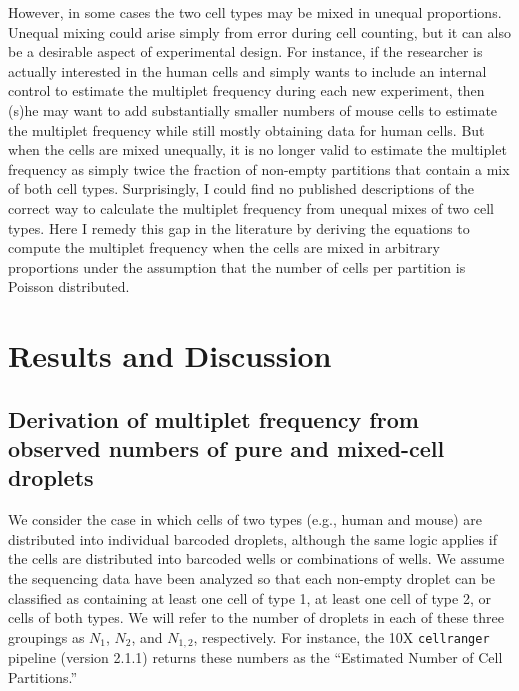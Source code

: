 \documentclass[fleqn,10pt,lineno]{wlpeerj} %
\begin{document}
However, in some cases the two cell types may be mixed in unequal proportions.
Unequal mixing could arise simply from error during cell counting, but it can also be a desirable aspect of experimental design.
For instance, if the researcher is actually interested in the human cells and simply wants to include an internal control to estimate the multiplet frequency during each new experiment, then (s)he may want to add substantially smaller numbers of mouse cells to estimate the multiplet frequency while still mostly obtaining data for human cells.
But when the cells are mixed unequally, it is no longer valid to estimate the multiplet frequency as simply twice the fraction of non-empty partitions that contain a mix of both cell types.
Surprisingly, I could find no published descriptions of the correct way to calculate the multiplet frequency from unequal mixes of two cell types.
Here I remedy this gap in the literature by deriving the equations to compute the multiplet frequency when the cells are mixed in arbitrary proportions under the assumption that the number of cells per partition is Poisson distributed.

\section*{Results and Discussion}
\label{sec:results}

\subsection*{Derivation of multiplet frequency from observed numbers of pure and mixed-cell droplets}
We consider the case in which cells of two types (e.g., human and mouse) are distributed into individual barcoded droplets, although the same logic applies if the cells are distributed into barcoded wells or combinations of wells.
We assume the sequencing data have been analyzed so that each non-empty droplet can be classified as containing at least one cell of type 1, at least one cell of type 2, or cells of both types.
We will refer to the number of droplets in each of these three groupings as $N_1$, $N_2$, and $N_{1,2}$, respectively.
For instance, the 10X \texttt{cellranger} pipeline (version 2.1.1) returns these numbers as the ``Estimated Number of Cell Partitions.''
\end{document}
